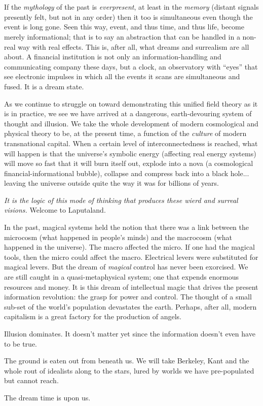 \chapter{}

If the \emph{mythology} of the past is \emph{everpresent},
at least in the \emph{memory} (distant signals presently felt, but not in any order) then it too is
simultaneous even though the event is long
gone. Seen this way, event, and thus time,
and thus life, become merely informational;
that is to say an abstraction that can be
handled in a non-real way with real effects.
This is, after all, what dreams and surrealism
are all about. A financial institution is not
only an information-handling and communicating company these days, but a clock, an
observatory with \enquote{eyes} that see electronic
impulses in which all the events it scans are
simultaneous and fused. It is a dream state.

As we continue to struggle on toward
demonstrating this unified field theory as it
is in practice, we see we have arrived
at a dangerous, earth-devouring system of
thought and illusion. We take the whole
development of modern cosmological and
physical theory to be, at the present time, a
function of the \emph{culture} of modern transnational capital. When a certain level of interconnectedness is reached, what will happen is that the universe's symbolic energy
(affecting real energy systems) will move so
fast that it will burn itself out, explode into a
nova (a cosmological financial-informational
bubble), collapse and compress back into a
black hole... leaving the universe outside
quite the way it was for billions of years.

\emph{It is the logic of this mode of thinking that
produces these wierd and surreal visions.}
Welcome to Laputaland.

In the past, magical systems held the notion that there was a link between the microcosm (what happened in people's minds)
and the macrocosm (what happened in the
universe). The macro affected the micro. If
one had the magical tools, then the micro
could affect the macro. Electrical levers were
substituted for magical levers. But the dream
of \emph{magical} control has never been exorcised.
We are still caught in a quasi-metaphysical
system; one that expends enormous resources
and money. It is this dream of intellectual
magic that drives the present information
revolution: the grasp for power and control.
The thought of a small sub-set of the world's
population devastates the earth. Perhaps,
after all, modern capitalism is a great factory
for the production of angels.

Illusion dominates. It doesn't matter yet
since the information doesn't even have to
be true.

The ground is eaten out from beneath us.
We will take Berkeley, Kant and the whole
rout of idealists along to the stars, lured by
worlds we have pre-populated but cannot
reach.

The dream time is upon us.

